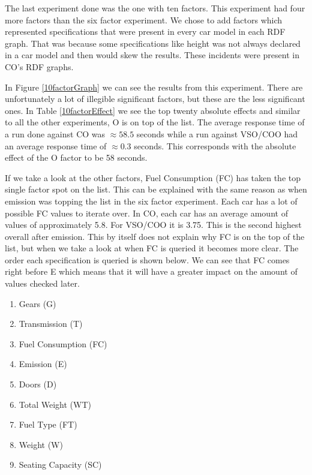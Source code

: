 \documentclass{llncs}
\begin{document}
The last experiment done was the one with ten factors. This experiment
had four more factors than the six factor experiment.  We chose to add
factors which represented specifications that were present in every
car model in each RDF graph. That was because some specifications like
height was not always declared in a car model and then would skew the
results. These incidents were present in CO's RDF graphs.

In Figure \ref{10factorGraph} we can see the results from this
experiment. There are unfortunately a lot of illegible significant
factors, but these are the less significant ones. In Table
\ref{10factorEffect} we see the top twenty absolute effects and
similar to all the other experiments, O is on top of the list. The
average response time of a run done against CO was $\approx58.5$
seconds while a run against VSO/COO had an average response time of
$\approx0.3$ seconds.  This corresponds with the absolute effect of
the O factor to be 58 seconds.
 
If we take a look at the other factors, Fuel Consumption (FC) has
taken the top single factor spot on the list.  This can be explained
with the same reason as when emission was topping the list in the six
factor experiment. Each car has a lot of possible FC values to iterate
over. In CO, each car has an average amount of values of approximately
5.8. For VSO/COO it is 3.75.  This is the second highest overall after
emission. This by itself does not explain why FC is on the top of the
list, but when we take a look at when FC is queried it becomes more
clear. The order each specification is queried is shown below.  We can
see that FC comes right before E which means that it will have a
greater impact on the amount of values checked later.

 \begin{enumerate}
  
		\item Gears (G)
		\item Transmission (T)
		\item Fuel Consumption (FC)
		\item Emission (E)
		\item Doors (D)
		\item Total Weight (WT)
		\item Fuel Type (FT)
		\item Weight (W)
		\item Seating Capacity (SC)
\end{enumerate}
\end{document}
